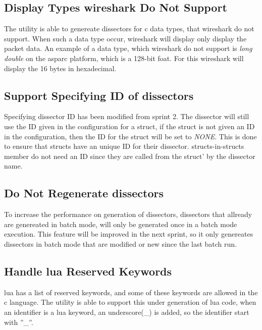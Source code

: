 \subsection{Display Types \Gls{wireshark} Do Not Support}
The \gls{utility} is able to genereate \glspl{dissector} for \Gls{c} data types, that \Gls{wireshark} 
do not support. When such a data type occur, \Gls{wireshark} will display only 
display the \gls{packet} data. An example of a data type, which \Gls{wireshark} do not 
support is \emph{long double} on the \gls{asparc} platform, which is a 128-bit foat. 
For this \Gls{wireshark} will display the 16 bytes in \gls{hexadecimal}.

\subsection{Support Specifying ID of \Glspl{dissector}}
Specifying \gls{dissector} ID has been modified from sprint 2. The \gls{dissector} will 
still use the ID given in the configuration for a \gls{struct}, if the \gls{struct} is not 
given an ID in the configuration, then the ID for the \gls{struct} will be set to 
\emph{NONE}. This is done to ensure that \glspl{struct} have an unique ID for their 
\gls{dissector}. \Glspl{struct}-in-\glspl{struct} \gls{member} do not need an ID since they are called 
from the \gls{struct}' by the \gls{dissector} name.

\subsection{Do Not Regenerate \glspl{dissector}}
To increase the performance on generation of \glspl{dissector}, \glspl{dissector} that 
allready are genereated in \gls{batch mode}, will only be generated once in a batch 
mode execution. This feature will be improved in the next sprint, so it only 
genereates \glspl{dissector} in \gls{batch mode} that are modified or new since the last 
batch run.

\subsection{Handle \Gls{lua} Reserved Keywords}
\Gls{lua} has a list of reserved keywords, and some of these keywords are allowed in 
the \Gls{c} language. The \gls{utility} is able to support this under generation of \Gls{lua} 
code, when an identifier is a lua keyword, an underscore(\_) is added, so the 
identifier start with ''\_''.

